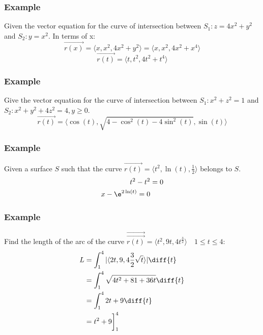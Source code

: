 \documentclass[letterpaper, 12pt]{math}
\begin{document}
\subsubsection*{Example}
Given the vector equation for the curve of intersection between
\( S_1: z = 4x^2+y^2 \) and \( S_2: y = x^2 \). In terms of x:
\[ \vec{r(x)} = \langle x,x^2,4x^2+y^2\rangle = \langle x,x^2,4x^2+x^4\rangle \]
\[ \vec{r(t)} = \langle t,t^2,4t^2+t^4\rangle \]

\subsubsection*{Example}
Give the vector equation for the curve of intersection between
\( S_1: x^2+z^2 = 1 \) and \( S_2: x^2+y^2+4z^2 = 4, y\ge0 \).
\[ \vec{r(t)} = \langle\cos(t),\sqrt{4-\cos^2(t)-4\sin^2(t)},\sin(t)\rangle \]

\subsubsection*{Example}
Given a surface \( S \) such that the curve \( \vec{r(t)} = \langle t^2,\ln(t),
\frac{1}{2}\rangle \) belongs to \( S \).
\begin{align*}
  t^2-t^2 &= 0 \\
  x-\e^{2\ln(t)} = 0
\end{align*}

\subsubsection*{Example}
Find the length of the arc of the curve \( \overrightarrow{\vec{r(t)}} =
\langle t^2,9t,4t^\frac{3}{2}\rangle \quad 1\le t\le 4 \):
\begin{align*}
  L &= \int_{1}^{4}|\langle2t,9,4\frac{3}{2}\sqrt{t}\rangle|\diff{t} \\
  &= \int_{1}^{4}\sqrt{4t^2+81+36t}\diff{t} \\
  &= \int_{1}^{4}2t+9\diff{t} \\
  &= t^2+9\bigg]^{4}_{1}
\end{align*}
\end{document}

